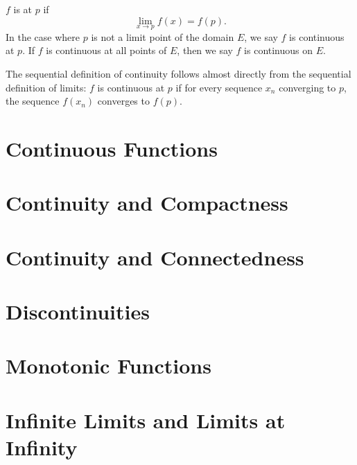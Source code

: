 \begin{definition}
$f$ is  at $p$ if
\[ \lim_{x\to p}f(x) = f(p). \]
In the case where $p$ is not a limit point of the domain $E$, we say $f$ is continuous at $p$. If $f$ is continuous at all points of $E$, then we say $f$ is continuous on $E$.
\end{definition}

The sequential definition of continuity follows almost directly from the sequential definition of limits: 
$f$ is continuous at $p$ if for every sequence $x_n$ converging to $p$, the sequence $f(x_n)$ converges to $f(p)$.



\section{Continuous Functions}

\section{Continuity and Compactness}

\section{Continuity and Connectedness}

\section{Discontinuities}

\section{Monotonic Functions}

\section{Infinite Limits and Limits at Infinity}
